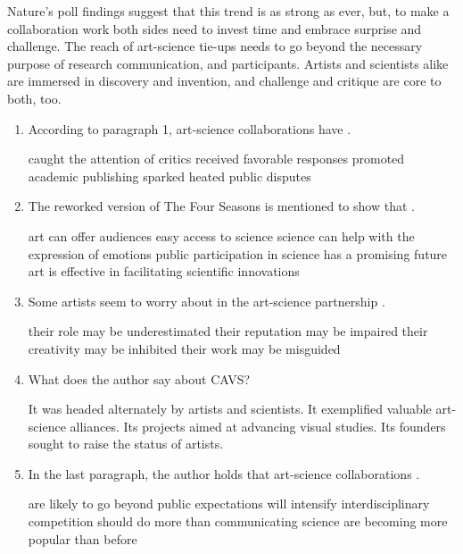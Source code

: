 Nature's poll findings suggest that this trend is as strong as ever, but,
to make a collaboration work both sides
need to invest time and embrace surprise and challenge. The reach of
art-science tie-ups needs to go beyond the
necessary purpose of research communication, and participants. Artists
and scientists alike are immersed in
discovery and invention, and challenge and critique are core to
both, too.

\begin{enumerate}[resume]
	\item
 According to paragraph 1, art-science collaborations have \lineread.


\fourchoices
{caught the attention of critics}
{received favorable responses}
{promoted academic publishing}
{sparked heated public disputes}



\item
The reworked version of The Four Seasons is mentioned to show
that \lineread.


\fourchoices
{art can offer audiences easy access to science}
{science can help with the expression of emotions}
{public participation in science has a promising future}
{art is effective in facilitating scientific innovations}



\item
 Some artists seem to worry about in the art-science
partnership \lineread.


\fourchoices
{their role may be underestimated}
{their reputation may be impaired}
{their creativity may be inhibited}
{their work may be misguided}



\item
 What does the author say about CAVS?

\fourchoices
{It was headed alternately by artists and scientists.}
{It exemplified valuable art-science alliances.}
{Its projects aimed at advancing visual studies.}
{Its founders sought to raise the status of artists.}


\item
In the last paragraph, the author holds that art-science
collaborations \lineread.

\fourchoices
{are likely to go beyond public expectations}
{will intensify interdisciplinary competition}
{should do more than communicating science}
{are becoming more popular than before}



\end{enumerate}


